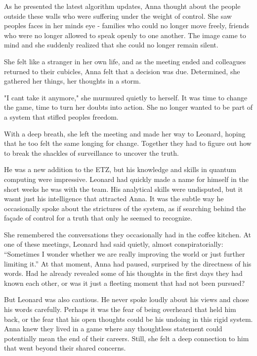\documentclass[
]{article}
\begin{document}
As he presented the latest algorithm updates, Anna thought about the
people outside these walls who were suffering under the weight of
control. She saw people\textquotesingle s faces in her
mind\textquotesingle s eye - families who could no longer move freely,
friends who were no longer allowed to speak openly to one another. The
image came to mind and she suddenly realized that she could no longer
remain silent.

She felt like a stranger in her own life, and as the meeting ended and
colleagues returned to their cubicles, Anna felt that a decision was
due. Determined, she gathered her things, her thoughts in a storm.

"I can\textquotesingle t take it anymore," she murmured quietly to
herself. It was time to change the game, time to turn her doubts into
action. She no longer wanted to be part of a system that stifled
people\textquotesingle s freedom.

With a deep breath, she left the meeting and made her way to Leonard,
hoping that he too felt the same longing for change. Together they had
to figure out how to break the shackles of surveillance to uncover the
truth.

He was a new addition to the ETZ, but his knowledge and skills in
quantum computing were impressive. Leonard had quickly made a name for
himself in the short weeks he was with the team. His analytical skills
were undisputed, but it wasn\textquotesingle t just his intelligence
that attracted Anna. It was the subtle way he occasionally spoke about
the strictures of the system, as if searching behind the façade of
control for a truth that only he seemed to recognize.

She remembered the conversations they occasionally had in the coffee
kitchen. At one of these meetings, Leonard had said quietly, almost
conspiratorially: ``Sometimes I wonder whether we are really improving
the world or just further limiting it.'' At that moment, Anna had
paused, surprised by the directness of his words. Had he already
revealed some of his thoughts in the first days they had known each
other, or was it just a fleeting moment that had not been pursued?

But Leonard was also cautious. He never spoke loudly about his views and
chose his words carefully. Perhaps it was the fear of being overheard
that held him back, or the fear that his open thoughts could be his
undoing in this rigid system. Anna knew they lived in a game where any
thoughtless statement could potentially mean the end of their careers.
Still, she felt a deep connection to him that went beyond their shared
concerns.
\end{document}
